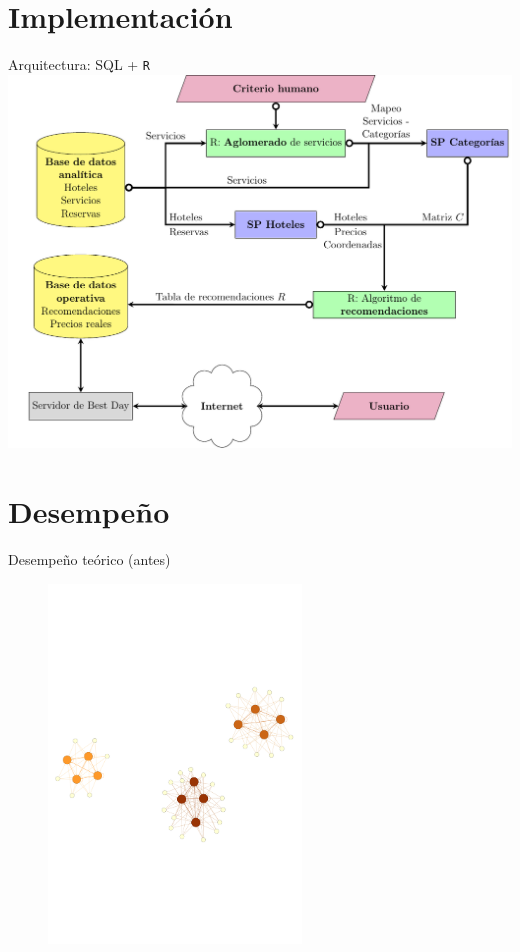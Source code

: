 \documentclass{beamer}
\begin{document}
\section{Implementación}

\begin{frame}{Arquitectura: SQL + \texttt{R}}
	\includegraphics[width=\textwidth]{imagenes/flowchart.pdf}
\end{frame}

\section{Desempeño}

\begin{frame}{Desempeño teórico (antes)}
	\begin{figure}
		\centering
		\includegraphics[width=0.6\textwidth, clip = true, trim = 0 0 0 80]{imagenes/disconexo.pdf}
	\end{figure}
\end{frame}
\end{document}
